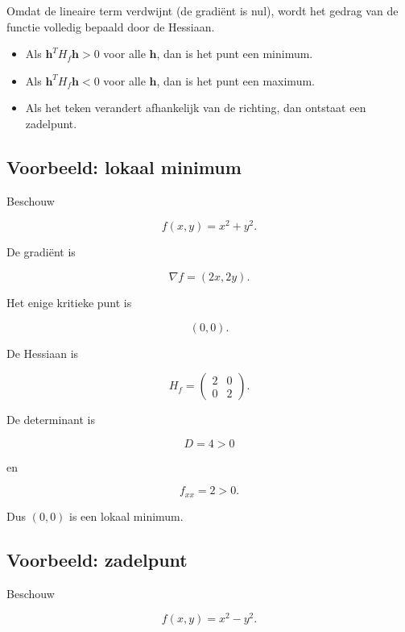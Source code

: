 \documentclass[11pt,a4paper]{article}
\begin{document}
    Omdat de lineaire term verdwijnt (de gradiënt is nul),
    wordt het gedrag van de functie volledig bepaald door de Hessiaan.

    \begin{itemize}

        \item Als $\mathbf{h}^T H_f \mathbf{h} > 0$ voor alle $\mathbf{h}$,
        dan is het punt een minimum.

        \item Als $\mathbf{h}^T H_f \mathbf{h} < 0$ voor alle $\mathbf{h}$,
        dan is het punt een maximum.

        \item Als het teken verandert afhankelijk van de richting,
        dan ontstaat een zadelpunt.

    \end{itemize}

    \subsection{Voorbeeld: lokaal minimum}

    Beschouw

    \[
        f(x,y) = x^2 + y^2.
    \]

    De gradiënt is

    \[
        \nabla f = (2x,2y).
    \]

    Het enige kritieke punt is

    \[
        (0,0).
    \]

    De Hessiaan is

    \[
        H_f =
        \begin{pmatrix}
            2 & 0 \\
            0 & 2
        \end{pmatrix}.
    \]

    De determinant is

    \[
        D = 4 > 0
    \]

    en

    \[
        f_{xx} = 2 > 0.
    \]

    Dus $(0,0)$ is een lokaal minimum.

    \subsection{Voorbeeld: zadelpunt}

    Beschouw

    \[
        f(x,y) = x^2 - y^2.
    \]
\end{document}
